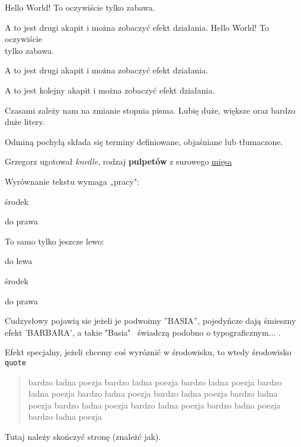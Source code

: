 \documentclass[11pt]{article}
\begin{document}
Hello World! To oczywiście tylko zabawa.

A to jest drugi akapit i można zobaczyć efekt działania.
Hello World! To oczywiście\\ tylko zabawa.

A to jest drugi akapit i można \linebreak zobaczyć efekt działania.

A to jest kolejny akapit i można \newline zobaczyć efekt działania.

Czasami zależy nam na zmianie stopnia pisma. Lubię {\large duże}, {\Large
większe} oraz {\LARGE bardzo duże} litery.

Odminą pochyłą składa się terminy definiowane, objaśniane lub tłumaczone.

Grzegorz ugotował {\em knedle}, rodzaj {\bf pulpetów} z surowego \underline{mięsa}

Wyrównanie tekstu wymaga „pracy":
\begin{center}środek \end{center}
\begin{flushright}do prawa\end{flushright}

To samo tylko jeszcze lewo:
\begin{flushleft}do lewa \end{flushleft} 
\begin{center}środek \end{center}
\begin{flushright}do prawa\end{flushright}

Cudzysłowy pojawią sie jeżeli je podwoimy ''BASIA'', pojedyńcze dają śmieszny efekt 'BARBARA', a takie "Basia" \ świadczą podobno o typograficznym... .

Efekt specjalny, jeżeli chcemy coś wyróznić w środowisku, to wtedy środowisko \verb+ quote+
\begin{quote}
bardzo ładna poezja bardzo ładna poezja bardzo ładna poezja 
bardzo ładna poezja bardzo ładna poezja bardzo ładna poezja 
bardzo ładna poezja bardzo ładna poezja bardzo ładna poezja 
bardzo ładna poezja bardzo ładna poezja \end{quote}

Tutaj należy skończyć stronę (znależć jak).
\newpage
\end{document}
